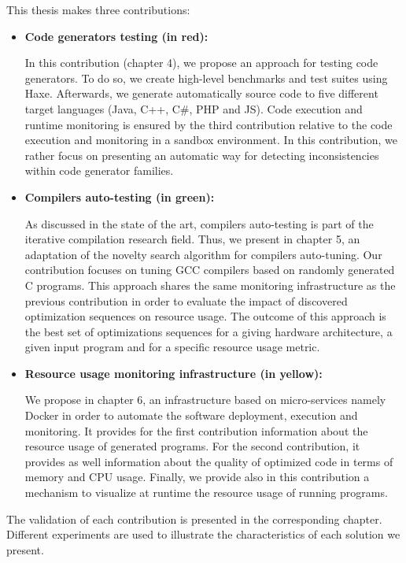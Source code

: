 This thesis makes three contributions:
\begin{itemize}
	\item \textbf{Code generators testing (in red): }
	
	In this contribution (chapter 4), we propose an approach for testing code generators. To do so, we create high-level benchmarks and test suites using Haxe. Afterwards, we generate automatically source code to five different target languages (Java, C++, C\#, PHP and JS). Code execution and runtime monitoring is ensured by the third contribution relative to the code execution and monitoring in a sandbox environment. In this contribution, we rather focus  on presenting an automatic way for detecting inconsistencies within code generator families.
	
	\item \textbf{Compilers auto-testing (in green):}
	
	As discussed in the state of the art, compilers auto-testing is part of the iterative compilation research field. Thus, we present in chapter 5, an adaptation of the novelty search algorithm for compilers auto-tuning. Our contribution focuses on tuning GCC compilers based on randomly generated C programs.
	This approach shares the same monitoring infrastructure as the previous contribution in order to evaluate the impact of discovered optimization sequences on resource usage. The outcome of this approach is the best set of optimizations sequences for a giving hardware architecture, a given input program and for a specific resource usage metric. 
	
	\item \textbf{Resource usage monitoring infrastructure (in yellow):}
	
	We propose in chapter 6, an infrastructure based on micro-services namely Docker in order to automate the software deployment, execution and monitoring. It provides for the first contribution information about the resource usage of generated programs. For the second contribution, it provides as well information about the quality of optimized code in terms of memory and CPU usage. Finally, we provide also in this contribution a mechanism to visualize at runtime the resource usage of running programs.
\end{itemize}

The validation of each contribution is presented in the corresponding chapter. Different experiments are used to illustrate the characteristics of each solution we present.




